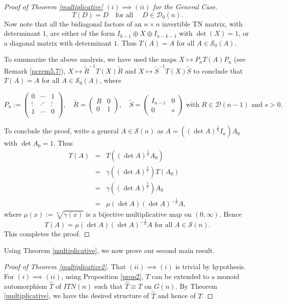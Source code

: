 \documentclass[11pt,reqno]{amsart}
\theoremstyle{plain}
\theoremstyle{definition}
\numberwithin{equation}{section}
\def\cS{\mathcal S}
\def\cD{\mathcal D}
\begin{document}
\begin{proof}[Proof of Theorem \ref{multiplicative} $(i)\implies (ii)$ for the General Case]
		\begin{equation}\label{pcmaineq3}
		T(D)=  D  \quad \text{for all }\quad D \in \cD_0(n).
	\end{equation}
Now note that all the bidiagonal factors of an $n\times n$ invertible TN matrix, with determinant $1$, are either of the form $I_{k-1}\oplus X \oplus I_{n-k-1}$ with $\det(X)=1$, or a diagonal matrix with determinant $1$. Thus  $T(A)=A$ for all $A \in \cS_0(A)$. %

To  summarize the above analysis, we have used the maps $X\mapsto P_nT(A)P_n$ (see Remark \ref{pcrem5.7}), $X \mapsto \tilde R^{-1}  T(X) \tilde R$ and $X \mapsto \tilde S^{-1}  T(X) \tilde S$ to conclude that $T(A)=A$ for all $A \in \cS_0(A)$, where

\[P_n:=\begin{pmatrix}
	0 & \cdots & 1 \\
	\vdots & \iddots & \vdots \\
	1 & \cdots & 0 \\
\end{pmatrix}, \quad \tilde R=\begin{pmatrix}
R & 0\\ 0 & 1
\end{pmatrix}, \quad \tilde S=\begin{pmatrix}
I_{n-1} & 0\\ 0 & s
\end{pmatrix} \text{ with } R\in \cD(n-1) \text{ and } s>0. \]
	
To conclude the proof, write a general $A \in \cS(n)$ as $A = ((\det A)^{\frac{1}{n}} I_n)A_0$ with $\det A_0 = 1$. Thus
	\begin{eqnarray*}
		T(A) &=& T((\det A)^{\frac{1}{n}} A_0)\\
		&=& \gamma((\det A)^{\frac{1}{n}})  T(A_0)\\
		&=& \gamma((\det A)^{\frac{1}{n}})  A_0\\
		&=&\mu(\det A)(\det A)^{-\frac{1}{n}} A ,
	\end{eqnarray*}
where $\mu(x):=\sqrt[n]{\gamma(x)}$ is a bijective multiplicative map on $(0,\infty)$.  Hence 
\[T(A)=\mu(\det A)(\det A)^{-\frac{1}{n}} A \text{ for all } A\in \cS(n).\]
 This completes the proof.
\end{proof}

Using Theorem \ref{multiplicative}, we now prove our second main result.
 
 \begin{proof}[Proof of Theorem \ref{multiplicative2}]
That $(ii)\implies (i)$ is trivial by hypothesis. For $(i)\implies (ii)$,  using Proposition \ref{prop2},  $T$ can be extended to a monoid automorphism $\hat T$ of $ITN(n)$ such that $\hat T \equiv T$ on $G(n)$. By Theorem \ref{multiplicative}, we have the desired structure of $\hat T$ and hence of $T$.
 \end{proof}
\end{document}
